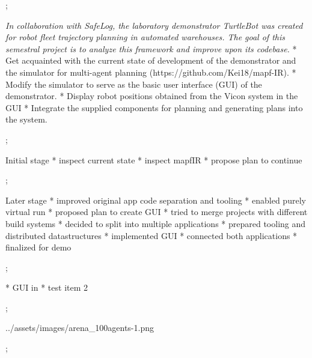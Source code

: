 

\worktype[B/EN]

\slideshow



\pg;


\textit {
    In collaboration with SafeLog, the laboratory demonstrator TurtleBot was created
    for robot fleet trajectory planning in automated warehouses. The goal of this semestral
    project is to analyze this framework and improve upon its codebase.
}
\begitems
* Get acquainted with the current state of development of the demonstrator and the simulator for multi-agent planning (https://github.com/Kei18/mapf-IR).
* Modify the simulator to serve as the basic user interface (GUI) of the demonstrator.
* Display robot positions obtained from the Vicon system in the GUI
* Integrate the supplied components for planning and generating plans into the system.
\enditems
\nl

\pg;



Initial stage
\begitems
* inspect current state
* inspect mapfIR
* propose plan to continue
\enditems

\pg;

Later stage
\begitems
* improved original app code separation and tooling
* enabled purely virtual run
* proposed plan to create GUI
* tried to merge projects with different build systems
* decided to split into multiple applications
* prepared tooling and distributed datastructures
* implemented GUI
* connected both applications
* finalized for demo


\enditems

\pg;


\begitems
* GUI in 
* test item 2
\enditems
\nl

\pg;



\centerline{\picw=14cm \inspic ../assets/images/arena_100agents-1.png }

\pg;

